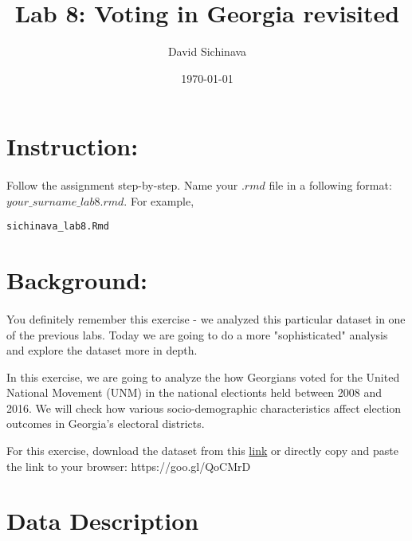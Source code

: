 \documentclass{article}\usepackage[]{graphicx}\usepackage[]{color}
\title{Lab 8: Voting in Georgia revisited}
\author{David Sichinava}
\date{\today}
\makeatletter
\newcommand{\hlstd}[1]{\textcolor[rgb]{0.345,0.345,0.345}{#1}}%
\newenvironment{kframe}{%
 \def\at@end@of@kframe{}%
 \ifinner\ifhmode%
  \def\at@end@of@kframe{\end{minipage}}%
  \begin{minipage}{\columnwidth}%
 \fi\fi%
 \def\FrameCommand##1{\hskip\@totalleftmargin \hskip-\fboxsep
 \colorbox{shadecolor}{##1}\hskip-\fboxsep
     \hskip-\linewidth \hskip-\@totalleftmargin \hskip\columnwidth}%
 \MakeFramed {\advance\hsize-\width
   \@totalleftmargin\z@ \linewidth\hsize
   \@setminipage}}%
 {\par\unskip\endMakeFramed%
 \at@end@of@kframe}
\newenvironment{knitrout}{}{} %
\makeatother
\begin{document}
\maketitle

\section*{Instruction:}

\paragraph{}
Follow the assignment step-by-step. Name your $.rmd$ file in a following format: $your\_surname\_lab8.rmd$. For example,

\begin{knitrout}
\color{fgcolor}\begin{kframe}
\begin{alltt}
\hlstd{sichinava_lab8.Rmd}
\end{alltt}
\end{kframe}
\end{knitrout}

\section*{Background:}
\paragraph{}

You definitely remember this exercise - we analyzed this particular dataset in one of the previous labs. Today we are going to do a more "sophisticated" analysis and explore the dataset more in depth.

In this exercise, we are going to analyze the how Georgians voted for the United National Movement (UNM) in the national electionts held between 2008 and 2016. We will check how various socio-demographic characteristics affect election outcomes in Georgia's electoral districts.

For this exercise, download the dataset from this  \href{https://goo.gl/QoCMrD}{link} or directly copy and paste the link to your browser: https://goo.gl/QoCMrD

\section*{Data Description}
\end{document}
